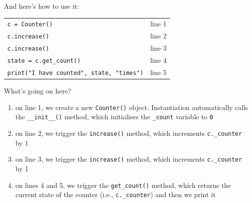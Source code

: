 \documentclass[t,handout,9pt]{beamer}
\begin{document}
\begin{frame}
\vfill
And here's how to use it:
\begin{table}[]
\begin{flushleft}
\begin{tabular}{ll}
\texttt{c = Counter()} &  \hfill \qquad \qquad \qquad line 1\\
\texttt{c.increase()} &  \hfill line 2\\
\texttt{c.increase()} &  \hfill line 3\\
\texttt{state = c.get\_count()} &  \hfill line 4\\
\texttt{print("I have counted", state, "times")} &  \hfill line 5\\
\end{tabular}
\end{flushleft}
\end{table}
\vfill
What's going on here?
\begin{enumerate}
	\item on line 1, we create a new \texttt{Counter()} object. Instantiation automatically calls the \texttt{\_\_init\_\_()} method, which initialises the \texttt{\_count} variable to \texttt{0}
	\item on line 2, we trigger the \texttt{increase()} method, which increments \texttt{c.\_counter} by 1
	\item on line 3, we trigger the \texttt{increase()} method, which increments \texttt{c.\_counter} by 1
	\item on lines 4 and 5, we trigger the \texttt{get\_count()} method, which returns the current state of the counter (i.e., \texttt{c.\_counter}) and then we print it
\end{enumerate}
\vfill
\end{frame}
%
\end{document}
